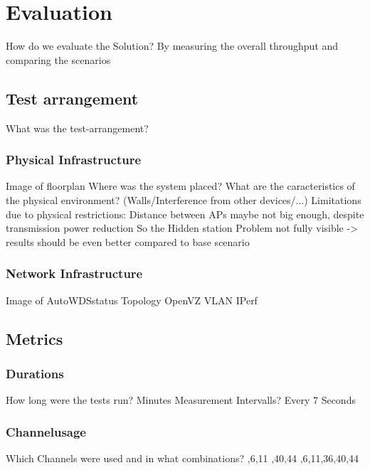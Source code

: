 \chapter{Evaluation}
How do we evaluate the Solution?\newline
  By measuring the overall throughput and comparing the scenarios\newline
\section{Test arrangement}
What was the test-arrangement? \newline
  \subsection{Physical Infrastructure}
    Image of floorplan \newline
    Where was the system placed? \newline
    What are the caracteristics of the physical environment? (Walls/Interference from other devices/...) \newline
    Limitations due to physical restrictions: \newline
      Distance between APs maybe not big enough, despite transmission power reduction\newline
      So the Hidden station Problem not fully visible -> results should be even better compared to base scenario \newline
  \subsection{Network Infrastructure}
    Image of AutoWDSstatus Topology
    OpenVZ \newline
    VLAN \newline
    IPerf \newline
\section{Metrics}
  \subsection{Durations}
    How long were the tests run?  Minutes
    Measurement Intervalls? \newline
      Every 7 Seconds
  \subsection{Channelusage}
    Which Channels were used and in what combinations?   ,6,11 ,40,44 ,6,11,36,40,44 \newline
